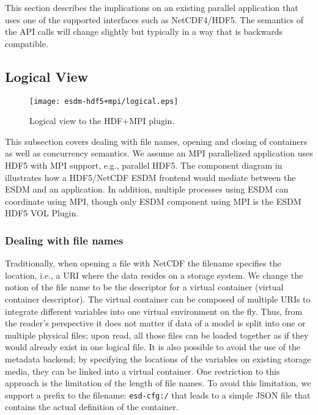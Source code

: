 This section describes the implications on an existing parallel application that uses one of the supported interfaces such as NetCDF4/HDF5.
The semantics of the API calls will change slightly but typically in a way that is backwards compatible.

\subsection{Logical View}


\begin{figure}
	\centering
	\texttt{[image: esdm-hdf5+mpi/logical.eps]}
	\caption{Logical view to the HDF+MPI plugin.}
	\label{fig:esdm hdf5 logical view}
\end{figure}

This subsection covers dealing with file names, opening and closing of containers as well as concurrency semantics.
We assume an MPI parallelized application uses HDF5 with MPI support, e.g., parallel HDF5.
The component diagram in  illustrates how a HDF5/NetCDF ESDM frontend would mediate between the ESDM and an application.
In addition, multiple processes using ESDM can coordinate using MPI, though only ESDM component using MPI is the ESDM HDF5 VOL Plugin.




\subsubsection{Dealing with file names}

Traditionally, when opening a file with NetCDF the filename specifies the location, i.e., a URI where the data resides on a storage system.
We change the notion of the file name to be the descriptor for a virtual container (virtual container descriptor).
The virtual container can be composed of multiple URIs to integrate different variables into one virtual environment on the fly.
Thus, from the reader's perspective it does not matter if data of a model is split into one or multiple physical files; upon read, all those files can be loaded together as if they would already exist in one logical file.
It is also possible to avoid the use of the metadata backend; by specifying the locations of the variables on existing storage media, they can be linked into a virtual container.
One restriction to this approach is the limitation of the length of file names.
To avoid this limitation, we support a prefix to the filename: \texttt{esd-cfg:/} that leads to a simple JSON file that contains the actual definition of the container.

